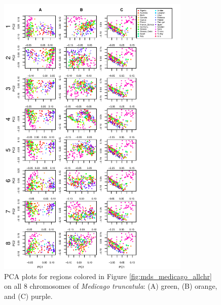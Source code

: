 \documentclass[11pt, oneside]{article}   	%
\begin{document}
\begin{figure}
    \begin{center}
       \includegraphics[width=0.82\textwidth]{FigS_pca_plots_for_Medicago_allchr_3peaks_byMDS}
    \end{center}
    \caption{
        PCA plots for regions colored in Figure \ref{fig:mds_medicago_allchr}
        on all 8 chromosomes of \textit{Medicago truncatula}:
        (A) green, (B) orange, and (C) purple.
        \label{fig:pca_peaks_medicago_allchr}
    }
\end{figure}
\end{document}
